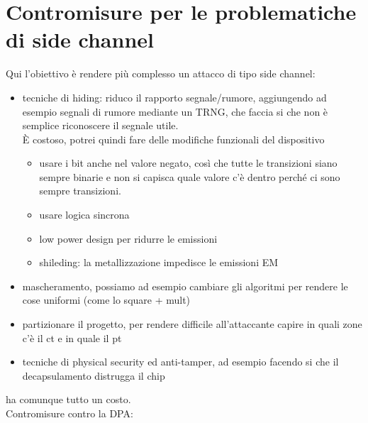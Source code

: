 \documentclass[oneside, 12pt]{extbook}
\begin{document}
\section{Contromisure per le problematiche di side channel}
Qui l'obiettivo è rendere più complesso un attacco di tipo side channel:
\begin{itemize}
	\item tecniche di hiding: riduco il rapporto segnale/rumore, aggiungendo ad esempio segnali di rumore mediante un TRNG, che faccia si che non è semplice riconoscere il segnale utile.
	\\È costoso, potrei quindi fare delle modifiche funzionali del dispositivo
	\begin{itemize}
		\item usare i bit anche nel valore negato, così che tutte le transizioni siano sempre binarie e non si capisca quale valore c'è dentro perché ci sono sempre transizioni.
		\item usare logica sincrona
		\item low power design per ridurre le emissioni
		\item shileding: la metallizzazione impedisce le emissioni EM
	\end{itemize}
	\item mascheramento, possiamo ad esempio cambiare gli algoritmi per rendere le cose uniformi (come lo square + mult)
	\item partizionare il progetto, per rendere difficile all'attaccante capire in quali zone c'è il ct e in quale il pt
	\item tecniche di physical security ed anti-tamper, ad esempio facendo si che il decapsulamento distrugga il chip
\end{itemize}
ha comunque tutto un costo.
\\Contromisure contro la DPA:
\end{document}
